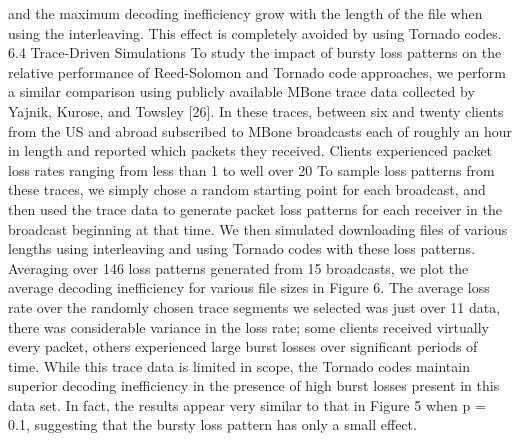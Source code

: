 \documentclass[12pt,a4paper,titlepage,twocolumn]{article}
\begin{document}
and the maximum decoding inefficiency grow
with the length of the file when using the interleaving.
This effect is completely avoided by using Tornado
codes.
6.4 Trace-Driven Simulations
To study the impact of bursty loss patterns on the relative
performance of Reed-Solomon and Tornado code
approaches, we perform a similar comparison using publicly
available MBone trace data collected by Yajnik,
Kurose, and Towsley [26]. In these traces, between six
and twenty clients from the US and abroad subscribed
to MBone broadcasts each of roughly an hour in length
and reported which packets they received. Clients experienced
packet loss rates ranging from less than 1%
to well over 20%
To sample loss patterns from these traces, we simply
chose a random starting point for each broadcast,
and then used the trace data to generate packet loss
patterns for each receiver in the broadcast beginning at
that time. We then simulated downloading files of various
lengths using interleaving and using Tornado codes
with these loss patterns. Averaging over 146 loss patterns
generated from 15 broadcasts, we plot the average
decoding inefficiency for various file sizes in Figure 6.
The average loss rate over the randomly chosen trace
segments we selected was just over 11%
data, there was considerable variance in the loss rate;
some clients received virtually every packet, others experienced
large burst losses over significant periods of
time. While this trace data is limited in scope, the Tornado
codes maintain superior decoding inefficiency in
the presence of high burst losses present in this data
set. In fact, the results appear very similar to that in
Figure 5 when p = 0.1, suggesting that the bursty loss
pattern has only a small effect.
\end{document}
